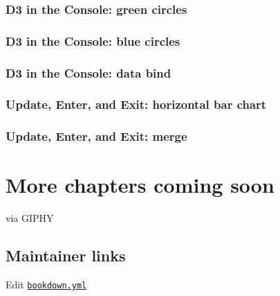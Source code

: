 \documentclass[openany]{book}
\begin{document}
\hypertarget{d3-in-the-console-green-circles}{%
\subsection*{D3 in the Console: green circles}\label{d3-in-the-console-green-circles}}

\hypertarget{d3-in-the-console-blue-circles}{%
\subsection*{D3 in the Console: blue circles}\label{d3-in-the-console-blue-circles}}

\hypertarget{d3-in-the-console-data-bind}{%
\subsection*{D3 in the Console: data bind}\label{d3-in-the-console-data-bind}}

\hypertarget{update-enter-and-exit-horizontal-bar-chart}{%
\subsection*{Update, Enter, and Exit: horizontal bar chart}\label{update-enter-and-exit-horizontal-bar-chart}}

\hypertarget{update-enter-and-exit-merge}{%
\subsection*{Update, Enter, and Exit: merge}\label{update-enter-and-exit-merge}}

\hypertarget{more-chapters-coming-soon}{%
\chapter{More chapters coming soon }\label{more-chapters-coming-soon}}

via GIPHY

\hypertarget{maintainer-links}{%
\section{Maintainer links}\label{maintainer-links}}

Edit \href{https://github.com/jtr13/d3book/edit/master/_bookdown.yml}{\texttt{bookdown.yml}}


\end{document}
